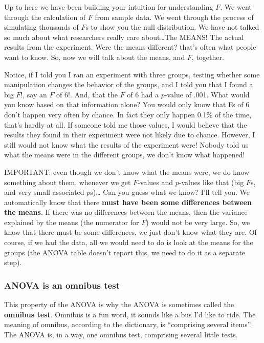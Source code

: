 \documentclass[
]{book}
\begin{document}
Up to here we have been building your intuition for understanding \(F\). We went through the calculation of \(F\) from sample data. We went through the process of simulating thousands of \(F\)s to show you the null distribution. We have not talked so much about what researchers really care about\ldots The MEANS! The actual results from the experiment. Were the means different? that's often what people want to know. So, now we will talk about the means, and \(F\), together.

Notice, if I told you I ran an experiment with three groups, testing whether some manipulation changes the behavior of the groups, and I told you that I found a big \(F\)!, say an \(F\) of 6!. And, that the \(F\) of 6 had a \(p\)-value of .001. What would you know based on that information alone? You would only know that Fs of 6 don't happen very often by chance. In fact they only happen 0.1\% of the time, that's hardly at all. If someone told me those values, I would believe that the results they found in their experiment were not likely due to chance. However, I still would not know what the results of the experiment were! Nobody told us what the means were in the different groups, we don't know what happened!

IMPORTANT: even though we don't know what the means were, we do know something about them, whenever we get \(F\)-values and \(p\)-values like that (big \(F\)s, and very small associated \(p\)s)\ldots{} Can you guess what we know? I'll tell you. We automatically know that there \textbf{must have been some differences between the means}. If there was no differences between the means, then the variance explained by the means (the numerator for \(F\)) would not be very large. So, we know that there must be some differences, we just don't know what they are. Of course, if we had the data, all we would need to do is look at the means for the groups (the ANOVA table doesn't report this, we need to do it as a separate step).

\hypertarget{anova-is-an-omnibus-test}{%
\subsubsection{ANOVA is an omnibus test}\label{anova-is-an-omnibus-test}}

This property of the ANOVA is why the ANOVA is sometimes called the \textbf{omnibus test}. Omnibus is a fun word, it sounds like a bus I'd like to ride. The meaning of omnibus, according to the dictionary, is ``comprising several items''. The ANOVA is, in a way, one omnibus test, comprising several little tests.
\end{document}
